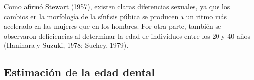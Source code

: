 \documentclass[a4paper,11pt]{article}
\begin{document}
Como afirmó Stewart (1957), existen claras diferencias sexuales, ya que los cambios en la morfología de la sínfisis púbica se producen a un ritmo más acelerado en las mujeres que en los hombres. Por otra parte, también se observaron deficiencias al determinar la edad de individuos entre los 20 y 40 años (Hanihara y Suzuki, 1978; Suchey, 1979).
\subsection{Estimación de la edad dental}

\newpage

\end{document}
